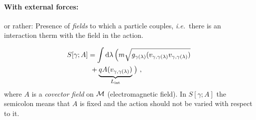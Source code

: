 \documentclass[11pt, a4paper, twocolumn]{article} %
\begin{document}
    \paragraph{With external forces:}
    or rather: Presence of \textit{fields} to which a particle couples, \textit{i.e.}\ there
    is an interaction therm with the field in the action.

    \begin{example}
        \begin{align*}
            S[\gamma;A] &= \int\diff\lambda \left(m\sqrt{g_{\gamma(\lambda)} ( v_{\gamma, \gamma(\lambda)} v_{\gamma, \gamma(\lambda)})}\right.\\
            &~+\underbrace{q A(v_{\gamma, \gamma(\lambda)})}_{L_\text{int}}\left.\vphantom{\sqrt{g_{\gamma(\lambda)}}}\right)\,,
        \end{align*}
        where $A$ is a \textit{covector field} on $\mathcal{M}$ (electromagnetic field).
        In $S[\gamma;A]$ the semicolon means that $A$ is fixed and the action should not be varied with respect to it.
    \end{example}


    
    

    



\newpage
\printbibliography[title={Bibliography}] %

\end{document}
